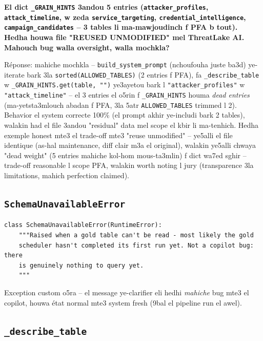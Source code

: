 \documentclass[11pt,a4paper]{report}
\DeclareRobustCommand{\code}[1]{\texttt{#1}}
\begin{document}
\begin{soual}
\textbf{El dict \code{\_GRAIN\_HINTS} 3andou 5 entries (\code{attacker\_profiles},
\code{attack\_timeline}, w zeda \code{service\_targeting},
\code{credential\_intelligence}, \code{campaign\_candidates} -- 3 tables
li ma-mawjoudinch f PFA b tout). Hedha houwa file "REUSED UNMODIFIED"
mel ThreatLake AI. Mahouch bug walla oversight, walla mochkla?}

Réponse: mahiche mochkla -- \code{build\_system\_prompt} (nchoufouha
juste ba3d) ye-iterate bark 3la \code{sorted(ALLOWED\_TABLES)} (2 entries
f PFA), fa \code{\_describe\_table} w \code{\_GRAIN\_HINTS.get(table, "")}
ye3ayetou bark l \code{"attacker\_profiles"} w \code{"attack\_timeline"}
-- el 3 entries el o5rin f \code{\_GRAIN\_HINTS} houma \emph{dead entries}
(ma-yetsta3mlouch abadan f PFA, 3la 5atr \code{ALLOWED\_TABLES} trimmed
l 2). Behavior el system correcte 100\% (el prompt akhir ye-includi bark
2 tables), walakin had el file 3andou "residual" data mel scope el kbir
li ma-tenhich. Hedha exemple honest mte3 el trade-off mte3 "reuse
unmodified" -- ye5alli el file identique (as-hal maintenance, diff clair
m3a el original), walakin ye5alli chwaya "dead weight" (5 entries mahiche
kol-hom mous-ta3mlin) f dict wa7ed sghir -- trade-off reasonable l scope
PFA, walakin worth noting l jury (transparence 3la limitations, mahich
perfection claimed).
\end{soual}

\subsection{\code{SchemaUnavailableError}}

\begin{lstlisting}[style=pystyle]
class SchemaUnavailableError(RuntimeError):
    """Raised when a gold table can't be read - most likely the gold
    scheduler hasn't completed its first run yet. Not a copilot bug: there
    is genuinely nothing to query yet.
    """
\end{lstlisting}

Exception custom o5ra -- el message ye-clarifier eli hedhi \emph{mahiche}
bug mte3 el copilot, houwa état normal mte3 system fresh (9bal el pipeline
run el awel).

\subsection{\code{\_describe\_table}}
\end{document}
